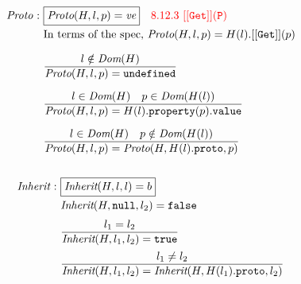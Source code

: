 \documentclass[a4paper, leqno]{amsart}
\def\inred{\color{red}}
\newcommand{\false}{{\tt false}}
\newcommand{\true}{{\tt true}}
\newcommand{\bool}{\emph{Bool}}
\newcommand{\loc}{\emph{Loc}}
\newcommand{\dom}{\emph{Dom}}
\begin{document}
{\[\begin{array}{l@{}l@{}ll}
\emph{Proto} & \ : \ & \fbox{$\emph{Proto}(H,l,p)=\emph{ve}$}
\quad{\inred 8.12.3\ {\tt[[Get]](P)}}\\[.5em]
&&\mbox{In terms of the spec,}\ \emph{Proto}(H,l,p)=H(l).{\tt[[Get]]}(p)\\[1em]
 & \ \ & \frac{
    \begin{matrix}
       {l \notin \dom(H)}
    \end{matrix}}{
    \begin{matrix}
       {\emph{Proto}(H,l,p)={\tt undefined}}
    \end{matrix}} & \\[1.5em]
 & \ \ & \frac{
    \begin{matrix}
       {l \in \dom(H)} & {p \in \dom(H(l))}
    \end{matrix}}{
    \begin{matrix}
       {\emph{Proto}(H,l,p)=H(l).{\tt property}(p).{\tt value}}
    \end{matrix}} & \\[1.5em]
 & \ \ & \frac{
    \begin{matrix}
      {l \in \dom(H)} & {p \notin \dom(H(l))}
    \end{matrix}}{
    \begin{matrix}
       {\emph{Proto}(H,l,p)=\emph{Proto}(H,H(l).{\tt proto},p)}
    \end{matrix}} & \\[1.5em]
 \end{array}
\]

\[
\begin{array}{l@{}l@{}ll}

\emph{Inherit} & \ : \ & \fbox{$\emph{Inherit}(H,l,l) = b$}\\[.5em]
 & \  \ & \emph{Inherit}(H,{\tt null},l_2) = \false & \\[.5em]
 & \ \ & \frac{
    \begin{matrix}
       l_1 = l_2
    \end{matrix}}{
    \begin{matrix}
       \emph{Inherit}(H,l_1,l_2)=\true
    \end{matrix}} & \\[1em]
 & \ \ & \frac{
    \begin{matrix}
       l_1 \neq l_2
    \end{matrix}}{
    \begin{matrix}
       \emph{Inherit}(H,l_1,l_2)=\emph{Inherit}(H,H(l_1).{\tt proto},l_2)
    \end{matrix}} & \\
 & & \\


\end{array}\]}
\end{document}

